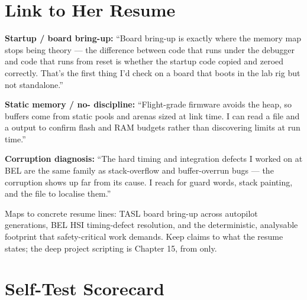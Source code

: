 \section{Link to Her Resume}

\begin{resumelink}
\textbf{Startup / board bring-up:} ``Board bring-up is exactly where the
memory map stops being theory --- the difference between code that runs under
the debugger and code that runs from reset is whether the startup code copied
 and zeroed  correctly. That's the first thing I'd check
on a board that boots in the lab rig but not standalone.''

\medskip
\textbf{Static memory / no- discipline:} ``Flight-grade firmware
avoids the heap, so buffers come from static pools and arenas sized at link
time. I can read a  file and a  output to confirm flash
and RAM budgets rather than discovering limits at run time.''

\medskip
\textbf{Corruption diagnosis:} ``The hard timing and integration defects I
worked on at BEL are the same family as stack-overflow and buffer-overrun bugs
--- the corruption shows up far from its cause. I reach for guard words, stack
painting, and the  file to localise them.''

\medskip
\small Maps to concrete resume lines: TASL board bring-up across autopilot
generations, BEL HSI timing-defect resolution, and the deterministic,
analysable footprint that safety-critical work demands. Keep claims to what the
resume states; the deep project scripting is Chapter 15, from
 only.
\end{resumelink}

\section{Self-Test Scorecard}

